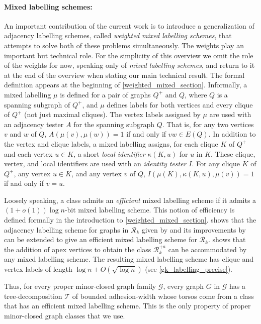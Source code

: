\documentclass[twoside,leqno]{article}
\newcommand{\defin}[1]{\emph{\textcolor{brightmaroon}{#1}}}
\newcommand{\Oh}{O}
\begin{document}
\paragraph{Mixed labelling schemes:} An important contribution of the current work is to introduce a generalization of adjacency labelling schemes, called \defin{weighted mixed labelling schemes}, that attempts to solve both of these problems simultaneously. The weights play an important but technical role. For the simplicity of this overview we omit the role of the weights for now, speaking only of \emph{mixed labelling schemes}, and return to it at the end of the overview when stating our main technical result. The formal definition appears at the beginning of \cref{weighted_mixed_section}. Informally, a mixed labelling $\mu$ is defined for a pair of graphs $Q^+$ and $Q$, where $Q$ is a spanning subgraph of $Q^+$, and $\mu$ defines labels for both vertices and every clique of $Q^+$ (not just maximal cliques). The vertex labels assigned by $\mu$ are used with an adjacency tester $A$ for the spanning subgraph $Q$.  That is, for any two vertices $v$ and $w$ of $Q$, $A(\mu(v),\mu(w)) = 1$ if and only if $vw\in E(Q)$.  In addition to the vertex and clique labels, a mixed labelling assigns, for each clique $K$ of $Q^+$ and each vertex $u\in K$, a short \defin{local identifier} $\kappa(K,u)$ for $u$ in $K$. These clique, vertex, and local identifiers are used with an \defin{identity tester} $I$.  For any clique $K$ of $Q^+$, any vertex $u\in K$, and any vertex $v$ of $Q$, $I(\mu(K),\kappa(K,u),\mu(v))=1$ if and only if $v=u$.

Loosely speaking, a class admits an \emph{efficient} mixed labelling scheme if it admits a $(1+o(1))\log n$-bit mixed labelling scheme. This notion of efficiency is defined formally in the introduction to \cref{weighted_mixed_section}.  shows that the adjacency labelling scheme for graphs in $\mathcal{R}_k$ given by \citet{dujmovic.esperet.ea:adjacency} and its improvements by \citet{gawrychowski.janczewski:simpler} can be extended to give an efficient mixed labelling scheme for $\mathcal{R}_k$.   shows that the addition of apex vertices to obtain the class $\mathcal{R}^{+a}_k$ can be accommodated by any mixed labelling scheme.  The resulting mixed labelling scheme has clique and vertex labels of length $\log n + \Oh(\sqrt{\log n})$ (see \cref{gk_labelling_precise}).

Thus, for every proper minor-closed graph family $\mathcal{G}$, every graph $G$ in $\mathcal{G}$ has a tree-decomposition $\mathcal{T}$ of bounded adhesion-width whose torsos come from a class that has an efficient mixed labelling scheme.  This is the only property of proper minor-closed graph classes that we use.
\end{document}
